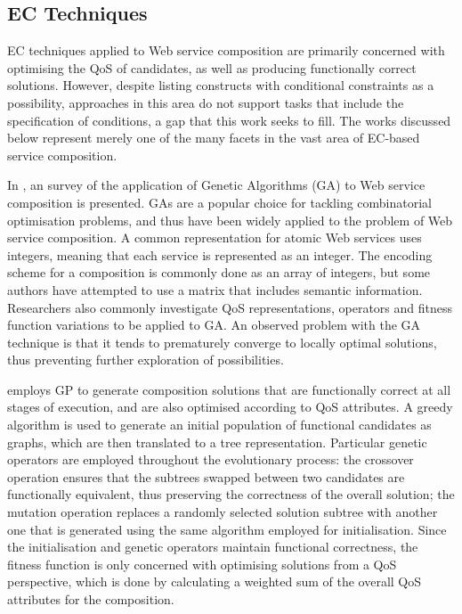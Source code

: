 \documentclass[conference]{IEEEtran}
\begin{document}
\subsection{EC Techniques}
EC techniques applied to Web service composition are primarily concerned with optimising the QoS of candidates, as well as producing functionally correct solutions. However, despite listing constructs with conditional constraints as a possibility, approaches in this area do not support tasks that include the specification of conditions, a gap that this work seeks to fill. The works discussed below represent merely one of the many facets in the vast area of EC-based service composition.

In \cite{wang2012survey}, an survey of the application of Genetic Algorithms (GA) to Web service composition is presented.
GAs are a popular choice for tackling combinatorial optimisation problems, and thus have been widely
applied to the problem of Web service composition. A common representation for atomic Web services uses integers,
meaning that each service is represented as an integer. The encoding scheme for a composition is commonly done 
as an array of integers, but some authors have attempted to use a matrix that includes semantic information. Researchers
also commonly investigate QoS representations, operators and fitness function variations to be applied to GA. An observed
problem with the GA technique is that it tends to prematurely converge to locally optimal solutions, thus preventing further 
exploration of possibilities.

\cite{wang2013genetic} employs GP to generate composition solutions that are functionally correct at all stages of execution, and are also optimised according to QoS attributes. A greedy algorithm is used to generate an initial population of functional candidates as graphs, which are then translated to a tree representation. Particular genetic operators are employed throughout the evolutionary process: the crossover operation ensures that the subtrees swapped between two candidates are functionally equivalent, thus preserving the correctness of the overall solution; the mutation operation replaces a randomly selected solution subtree with another one that is generated using the same algorithm employed for initialisation. Since the initialisation and genetic operators maintain functional correctness, the fitness function is only concerned with optimising solutions from a QoS perspective, which is done by calculating a weighted sum of the overall QoS attributes for the composition.
\end{document}
